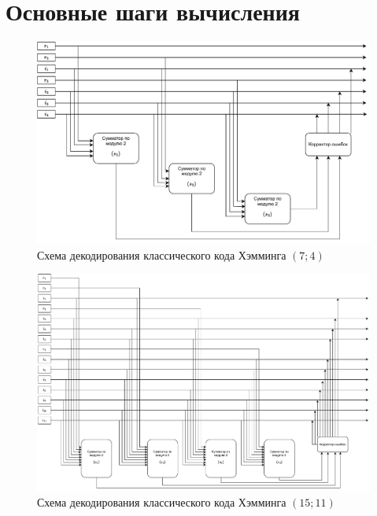 \section{Основные шаги вычисления}

\begin{figure}
    \centering
    \includegraphics[scale=0.7]{img/74.pdf}
    \caption{Схема декодирования классического кода Хэмминга $(7; 4)$}
\end{figure}

\begin{figure}
    \centering
    \includegraphics[scale=0.5]{img/1511.pdf}
    \caption{Схема декодирования классического кода Хэмминга $(15; 11)$}
\end{figure}



